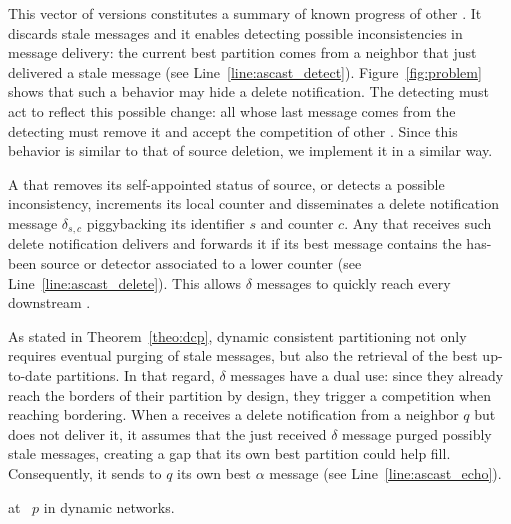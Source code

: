 This vector of versions constitutes a summary of known progress of
other \nodes. It discards stale messages and it enables detecting
possible inconsistencies in message delivery: the current best
partition comes from a neighbor that just delivered a stale message
(see Line~\ref{line:ascast_detect}). Figure~\ref{fig:problem} shows
that such a behavior may hide a delete notification. The detecting
\process must act to reflect this possible change: all \processes
whose last message comes from the detecting \process must remove it
and accept the competition of other \processes. Since this behavior is
similar to that of source deletion, we implement it in a similar way.

A \process that removes its self-appointed status of source, or
detects a possible inconsistency, increments its local counter and
disseminates a delete notification message $\delta_{s, c}$
piggybacking its identifier $s$ and counter $c$. Any \process that
receives such delete notification delivers and forwards it if its best
message contains the has-been source or detector associated to a lower
counter (see Line~\ref{line:ascast_delete}). This allows $\delta$
messages to quickly reach every downstream \process.

As stated in Theorem~\ref{theo:dcp}, dynamic consistent partitioning
not only requires eventual purging of stale messages, but also the
retrieval of the best up-to-date partitions.  In that regard, $\delta$
messages have a dual use: since they already reach the borders of
their partition by design, they trigger a competition when reaching
bordering.  When a \process receives a delete notification from a
neighbor $q$ but does not deliver it, it assumes that the just
received $\delta$ message purged possibly stale messages, creating a
gap that its own best partition could help fill. Consequently, it
sends to $q$ its own best $\alpha$ message (see
Line~\ref{line:ascast_echo}).

\begin{algorithm}
  
  \caption{\label{algo:edges}\NAME at \Process~$p$ in dynamic networks.}
\end{algorithm}

